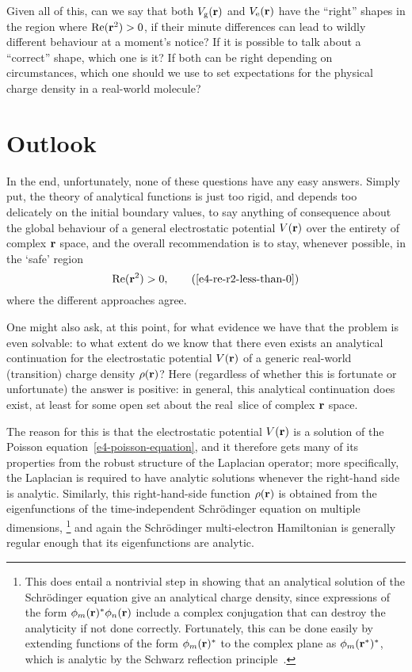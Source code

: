 Given all of this, can we say that both $V_\mathrm{g}(\vb{r})$ and $V_\mathrm{e}(\vb{r})$ have the ``right'' shapes in the region where $\Re(\vb{r}^2)>0$, if their minute differences can lead to wildly different behaviour at a moment's notice? If it is possible to talk about a ``correct'' shape, which one is it? If both can be right depending on circumstances, which one should we use to set expectations for the physical charge density in a real-world molecule?






\section{Outlook}
In the end, unfortunately, none of these questions have any easy answers. Simply put, the theory of analytical functions is just too rigid, and depends too delicately on the initial boundary values, to say anything of consequence about the global behaviour of a general electrostatic potential $V(\vb{r})$ over the entirety of complex $\vb{r}$ space, and the overall recommendation is to stay, whenever possible, in the `safe' region
\begin{equation}
\Re(\vbr^2)>0,
\backtag{e4-re-r2-less-than-0}
\end{equation}
where the different approaches agree.

One might also ask, at this point, for what evidence we have that the problem is even solvable: to what extent do we know that there even exists an analytical continuation for the electrostatic potential $V(\vb{r})$ of a generic real-world (transition) charge density $\rho(\vb{r})$? Here (regardless of whether this is fortunate or unfortunate) the answer is positive: in general, this analytical continuation does exist, at least for some open set about the real~slice of complex $\vb{r}$ space.


The reason for this is that the electrostatic potential $V(\vb{r})$ is a solution of the Poisson equation~\eqref{e4-poisson-equation}, and it therefore gets many of its properties from the robust structure of the Laplacian operator; more specifically, the Laplacian is required to have analytic solutions whenever the right-hand side is analytic. Similarly, this right-hand-side function $\rho(\vb{r})$ is obtained from the eigenfunctions of the time-independent Schrödinger equation on multiple dimensions,%
\footnote{%
This does entail a nontrivial step in showing that an analytical solution of the Schrödinger equation give an analytical charge density, since expressions of the form $\phi_m(\vb{r})^* \phi_n(\vb{r})$ include a complex conjugation that can destroy the analyticity if not done correctly. Fortunately, this can be done easily by extending functions of the form $\phi_m(\vb{r})^*$ to the complex plane as $\phi_m(\vb{r}^*)^*$, which is analytic by the Schwarz reflection principle~\cite[p.~119-120]{noguchi_complex_analysis}.
}
and again the Schrödinger multi-electron Hamiltonian is generally regular enough that its eigenfunctions are analytic.



